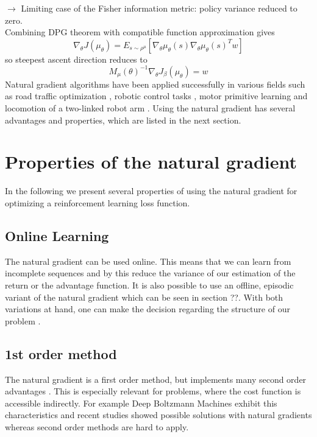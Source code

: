 $\rightarrow$ Limiting case of the Fisher information metric: policy variance reduced to zero.\\
Combining DPG theorem with compatible function approximation gives 
\begin{equation}
\nabla_{\theta}J(\mu_{\theta}) = E_{s\sim\rho^{\mu}}[\nabla_{\theta} \mu_{\theta}(s) \nabla_{\theta} \mu_{\theta}(s)^{T}w]
\end{equation} 
so steepest ascent direction reduces to
\begin{equation}
M_{\mu}(\theta)^{-1}\nabla_{\theta}J_{\beta}(\mu_{\theta})=w
\end{equation} 
Natural gradient algorithms have been applied successfully in various fields such as road traffic optimization \cite{richter2007natural}, robotic control tasks \cite{kim2010impedance}, motor primitive learning \cite{peters2007applying} and locomotion of a two-linked robot arm \cite{park2005rls}. Using the natural gradient has several advantages and properties, which are listed in the next section.


\newpage
\section{Properties of the natural gradient}
In the following we present several properties of using the natural gradient for optimizing a reinforcement learning loss function.
\subsection{Online Learning}
The natural gradient can be used online. This means that we can learn from incomplete sequences and by this reduce the variance of our estimation of the return or the advantage function. It is also possible to use an offline, episodic variant of the natural gradient which can be seen in section ??. With both variations at hand, one can make the decision regarding the structure of our problem \cite{pascanu2013revisiting, peters2008natural}.

\subsection{1st order method}
The natural gradient is a first order method, but implements many second order advantages \cite{pascanu2013revisiting}. This is especially relevant for problems, where the cost function is accessible indirectly. For example Deep Boltzmann Machines exhibit this characteristics and recent studies showed possible solutions with natural gradients \cite{desjardins2013metric} whereas second order methods are hard to apply.

